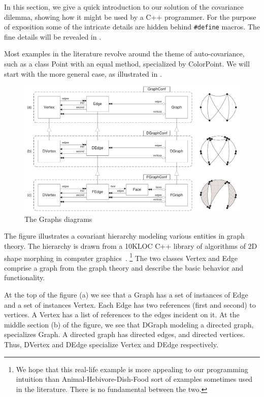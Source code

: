 \documentclass[11pt]{article}
\numberwithin{figure}{section}
\newcommand\CC{\Lang{\mbox{C++}}\xspace}
\newcommand\Lang[1]{\textsc{#1}}
\newcommand\Cls[1]{\textsf{#1}}
\begin{document}
In this section, we give a quick introduction to our solution
    of the covariance dilemma, showing how it might be used by a \CC programmer.
For the purpose of exposition some of the intricate details are hidden
    behind \texttt{\#define} macros.
The fine details will be revealed in .

Most examples in the literature revolve around the theme of auto-covariance,
    such as a class \Cls{Point} with an \Cls{equal} method,
    specialized by \Cls{ColorPoint}.
We will start with the more general case, as
    illustrated in .

\begin{figure}[!htb] %
\includegraphics[width=\textwidth]{graphs.pdf}
\caption{The Graphs diagrams}
\label{Figure:Graphs}
\end{figure}

The figure illustrates a covariant hierarchy
    modeling various entities in graph theory.
The hierarchy is drawn from a 10KLOC \CC library
    of algorithms of 2D shape morphing in computer
    graphics~\cite{Gotsman:Surazhsky:01}.%
\footnote{We hope that this real-life example is more appealing to our programming
    intuition than \Cls{Animal}-\Cls{Hebivore}-\Cls{Dish}-\Cls{Food} sort
    of examples sometimes used in the literature.
There is no fundamental between the two.}
The two classes \Cls{Vertex} and \Cls{Edge} comprise
    a graph from the graph theory and describe the basic behavior and functionality.

At the top of the figure (a) we see that a \Cls{Graph} has a set of instances of \Cls{Edge}
    and a set of instances \Cls{Vertex}.
Each \Cls{Edge} has two references (\Cls{first} and \Cls{second}) to vertices.
A \Cls{Vertex} has a list of references to the edges incident on it.
At the middle section (b) of the figure, we see that \Cls{DGraph} modeling
    a directed graph, specializes \Cls{Graph}.
A directed graph has directed edges, and directed vertices.
Thus, \Cls{DVertex} and \Cls{DEdge} specialize \Cls{Vertex} and
    \Cls{DEdge} respectively.
\end{document}
